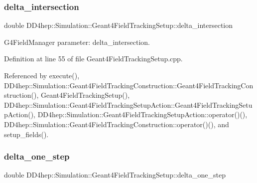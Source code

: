 \hypertarget{struct_d_d4hep_1_1_simulation_1_1_geant4_field_tracking_setup_ad0e9178802e02034db7130dc778d1fc7}{}\label{struct_d_d4hep_1_1_simulation_1_1_geant4_field_tracking_setup_ad0e9178802e02034db7130dc778d1fc7} 
\subsubsection{\texorpdfstring{delta\+\_\+intersection}{delta\_intersection}}
{\footnotesize\ttfamily double D\+D4hep\+::\+Simulation\+::\+Geant4\+Field\+Tracking\+Setup\+::delta\+\_\+intersection\hspace{0.3cm}{\ttfamily [protected]}}



G4\+Field\+Manager parameter\+: delta\+\_\+intersection. 



Definition at line 55 of file Geant4\+Field\+Tracking\+Setup.\+cpp.



Referenced by execute(), D\+D4hep\+::\+Simulation\+::\+Geant4\+Field\+Tracking\+Construction\+::\+Geant4\+Field\+Tracking\+Construction(), Geant4\+Field\+Tracking\+Setup(), D\+D4hep\+::\+Simulation\+::\+Geant4\+Field\+Tracking\+Setup\+Action\+::\+Geant4\+Field\+Tracking\+Setup\+Action(), D\+D4hep\+::\+Simulation\+::\+Geant4\+Field\+Tracking\+Setup\+Action\+::operator()(), D\+D4hep\+::\+Simulation\+::\+Geant4\+Field\+Tracking\+Construction\+::operator()(), and setup\+\_\+fields().

\hypertarget{struct_d_d4hep_1_1_simulation_1_1_geant4_field_tracking_setup_a7cc063c19cc28d0226234c6cb5e9b10e}{}\label{struct_d_d4hep_1_1_simulation_1_1_geant4_field_tracking_setup_a7cc063c19cc28d0226234c6cb5e9b10e} 
\subsubsection{\texorpdfstring{delta\+\_\+one\+\_\+step}{delta\_one\_step}}
{\footnotesize\ttfamily double D\+D4hep\+::\+Simulation\+::\+Geant4\+Field\+Tracking\+Setup\+::delta\+\_\+one\+\_\+step\hspace{0.3cm}{\ttfamily [protected]}}



